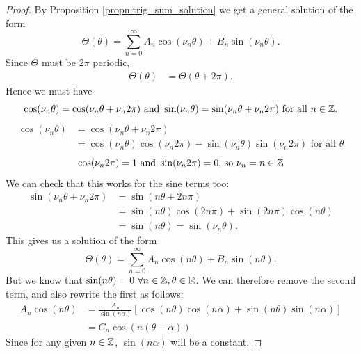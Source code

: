   \begin{proof} By Proposition \ref{propn:trig_sum_solution} we get a general solution of the form
      \begin{equation}
          \Theta(\theta) = \sum^\infty_{n=0} A_n \cos(\nu_n \theta) + B_n \sin(\nu_n \theta).
      \end{equation}
  Since $\Theta$ must be $2\pi$ periodic,
      \begin{align*}
          \Theta(\theta) &= \Theta(\theta + 2\pi).
      \end{align*}
  Hence we must have
      \begin{equation*}
          \cos(\nu_n \theta) = \cos(\nu_n \theta + \nu_n 2 \pi)
          ~\text{and}~
          \sin(\nu_n \theta) = \sin(\nu_n \theta + \nu_n 2 \pi)
          ~\text{for all}~ n \in \mathbb{Z}.
      \end{equation*}
      \begin{align*}
          \cos(\nu_n \theta) &= \cos(\nu_n \theta + \nu_n 2 \pi)\\
          &= \cos(\nu_n \theta) \cos(\nu_n 2 \pi) - \sin(\nu_n \theta) \sin(\nu_n 2 \pi) \text{ for all }\theta
      \end{align*}
      \begin{equation*}
          \cos(\nu_n 2 \pi) = 1
          \text{ and }
          \sin (\nu_n 2 \pi) = 0 \text{, so } \nu_n = n \in \mathbb{Z}
      \end{equation*}
  We can check that this works for the sine terms too:
      \begin{align*}
          \sin(\nu_n \theta + \nu_n 2\pi)
          &= \sin(n \theta + 2n \pi)\\
          &= \sin(n \theta) \cos(2n\pi) + \sin(2n\pi)\cos(n\theta)\\
          &= \sin(n\theta) = \sin(\nu_n \theta).
      \end{align*}
  This gives us a solution of the form
    \begin{equation*}
      \Theta(\theta) = \sum^\infty_{n=0} A_n \cos(n \theta) + B_n \sin(n \theta).
    \end{equation*}
  But we know that $\sin(n \theta) = 0 ~\forall n \in \mathbb{Z}, \theta \in \mathbb{R}$. We can therefore remove the second term, and also rewrite the first as follows:
    \begin{align*}
      A_n\cos(n\theta)
      &= \frac{A_n}{\sin(n\alpha)} [ \cos(n \theta) \cos(n \alpha) + \sin(n\theta)\sin(n\alpha)  ] \\
      &= C_n \cos(n(\theta - \alpha))
    \end{align*}
  Since for any given $n\in\mathbb{Z}$, $\sin(n\alpha)$ will be a constant.
  \end{proof}\par
%
